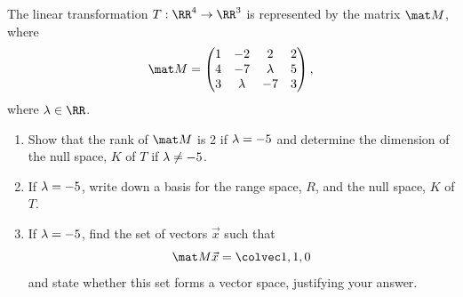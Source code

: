 \begin{problem}
    The linear transformation $T : \RR^4 \to \RR^3$ is represented by the matrix $\mat M$, where \[\mat M = \begin{pmatrix}1 & -2 & 2 & 2 \\ 4 & -7 & \l & 5 \\ 3 & \l & -7 & 3\end{pmatrix},\] where $\l \in \RR$.

    \begin{enumerate}
        \item Show that the rank of $\mat M$ is 2 if $\lambda = -5$ and determine the dimension of the null space, $K$ of $T$ if $\lambda \neq -5$.
        \item If $\lambda = -5$, write down a basis for the range space, $R$, and the null space, $K$ of $T$.
        \item If $\lambda = -5$, find the set of vectors $\vec x$ such that \[\mat M \vec x = \cveciii110\] and state whether this set forms a vector space, justifying your answer.
    \end{enumerate}
\end{problem}
